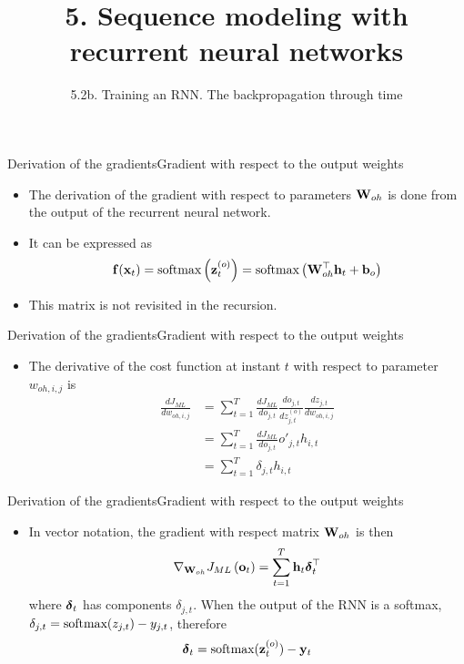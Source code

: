 \documentclass{beamer}
\title{5. Sequence modeling with recurrent neural networks}
\subtitle{5.2b. Training an RNN. The backpropagation through time}
\begin{document}
\maketitle

\begin{frame}{Derivation of the gradients}{Gradient with respect to the output weights}
\begin{itemize}
\item The derivation of the gradient with respect to parameters ${\bf W}_{oh}$ is done from the  output of the recurrent neural network.
\item It can be expressed as 
\begin{equation}
    {\bf f}({\bf x}_t)  =  \text{softmax}\left({\bf z}^{(o)}_{t}\right) =\text{softmax}\left({\bf W}_{oh}^\top{\bf h}_{t} +{\bf b}_o\right) 
\end{equation}
\item This matrix is not revisited in the recursion.
\end{itemize}
\end{frame}

\begin{frame}{Derivation of the gradients}{Gradient with respect to the output weights}
\begin{itemize}
\item The derivative of the cost function at instant $t$ with respect to parameter $w_{oh,i,j}$ is
\begin{equation}\label{eq:gradient_RNN_oh}
\begin{split}
\frac{dJ_{ML}}{dw_{oh,i,j}}&=\sum_{t=1}^T\frac{dJ_{ML}}{do_{j,t}} \frac{do_{j,t}}{dz^{(o)}_{j,t}}\frac{dz_{j,t}}{dw_{oh,i,j}}\\
&=\sum_{t=1}^T\frac{dJ_{ML}}{do_{j,t}} o'_{j,t}h_{i,t}\\
&=\sum_{t=1}^T\delta_{j,t}h_{i,t}
\end{split}
\end{equation}
\end{itemize}
\end{frame}

\begin{frame}{Derivation of the gradients}{Gradient with respect to the output weights}
\begin{itemize}
    \item In vector notation, the gradient with respect matrix ${\bf W}_{oh}$ is then  
\begin{equation}\label{eq:gradient_oh}
 \nabla_{{\bf W}_{oh}}J_{ML}\left( {\bf o}_t \right)  =  \sum_{t=1}^T   {\bf h}_{t}{\boldsymbol \delta}_{t}^\top 
\end{equation}
where ${\boldsymbol \delta}_t$ has components $\delta_{j,t}$. When the output of the RNN is a softmax, $\delta_{j,t} =  \text{softmax}(z_{j,t}) - y_{j,t}$, therefore 
\begin{equation}\label{eq:delta_output_RR}
    {\boldsymbol \delta}_{t} = \text{softmax}({\bf z}^{(o)}_{t}) - {\bf y}_{t}
\end{equation}
\end{itemize}
\end{frame}
\end{document}
